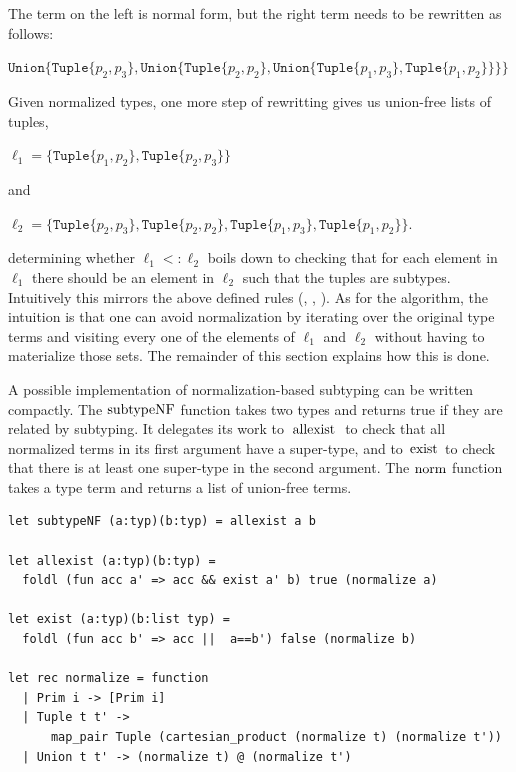 \documentclass[a4paper,english]{lipics-v2019}
\newcommand{\xt}[1]{\texttt{#1}}
\newcommand{\union}[2]{\xt{Union\{}#1,#2\xt{\}}}
\renewcommand{\c}[1]{\ensuremath{\text{\lstinline{#1}}}\xspace}
\newcommand{\tuple}[1]{\xt{Tuple\{}#1\xt{\}}}
\begin{document}
\noindent
The term on the left is normal form, but the right term  needs to be
rewritten as follows:

\medskip
$\union{ \tuple{p_2,p_3}}
  {\union{ \tuple{p_2,p_2}}
    {\union{ \tuple{p_1,p_3}}
           {\tuple{p_1,p_2}}}}$
\medskip

\noindent
Given normalized types, one more step of rewritting gives us union-free
lists of tuples,

\medskip
$\ell_1 = \{  \tuple{p_1,p_2}, \tuple{p_2,p_3}  \}$
\medskip

\noindent and

\medskip
$\ell_2 = \{  \tuple{p_2,p_3}, \tuple{p_2,p_2}, \tuple{p_1,p_3}, 
          \tuple{p_1,p_2} \}$.
\medskip

\noindent determining whether $\ell_1 <: \ell_2$ boils down to checking that
for each element in $\ell_1$ there should be an element in $\ell_2$ such
that the tuples are subtypes. Intuitively this mirrors the above defined
rules ({\sc [allexist]}, {\sc [existL/R]}, {\sc [tuple]}). As for the
algorithm, the intuition is that one can avoid normalization by iterating
over the original type terms and visiting every one of the elements of
$\ell_1$ and $\ell_2$ without having to materialize those sets. The
remainder of this section explains how this is done.

A possible implementation of normalization-based subtyping can be written
compactly.  The \c{subtypeNF} function takes two types and returns true if
they are related by subtyping. It delegates its work to \c{allexist} to
check that all normalized terms in its first argument have a super-type, and
to \c{exist} to check that there is at least one super-type in the second
argument.  The \c{norm} function takes a type term and returns a list of
union-free terms.

\begin{lstlisting}
let subtypeNF (a:typ)(b:typ) = allexist a b

let allexist (a:typ)(b:typ) = 
  foldl (fun acc a' => acc && exist a' b) true (normalize a)

let exist (a:typ)(b:list typ) = 
  foldl (fun acc b' => acc ||  a==b') false (normalize b)

let rec normalize = function
  | Prim i -> [Prim i]
  | Tuple t t' -> 
      map_pair Tuple (cartesian_product (normalize t) (normalize t'))
  | Union t t' -> (normalize t) @ (normalize t')
\end{lstlisting}


\end{document}
